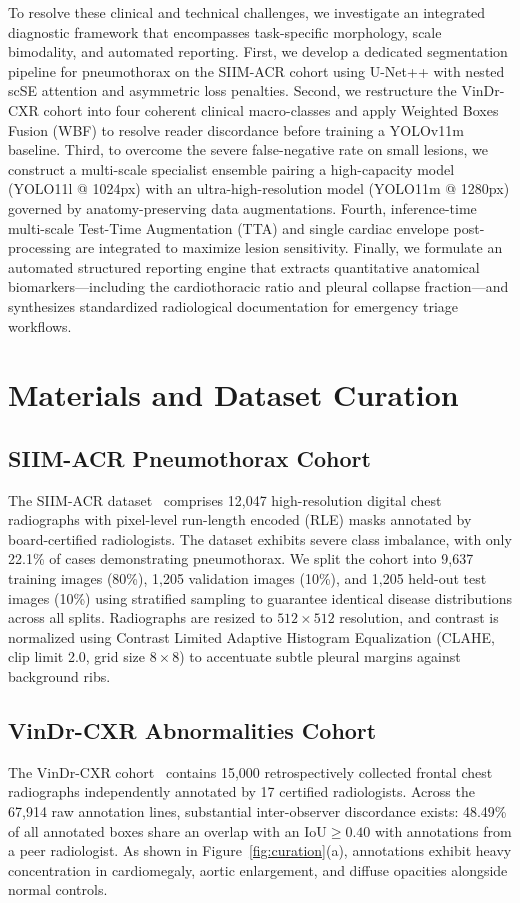 \documentclass[10pt,twocolumn,letterpaper]{article}
\begin{document}
To resolve these clinical and technical challenges, we investigate an integrated diagnostic framework that encompasses task-specific morphology, scale bimodality, and automated reporting. First, we develop a dedicated segmentation pipeline for pneumothorax on the SIIM-ACR cohort using U-Net++ with nested scSE attention and asymmetric loss penalties. Second, we restructure the VinDr-CXR cohort into four coherent clinical macro-classes and apply Weighted Boxes Fusion (WBF) to resolve reader discordance before training a YOLOv11m baseline. Third, to overcome the severe false-negative rate on small lesions, we construct a multi-scale specialist ensemble pairing a high-capacity model (YOLO11l @ 1024px) with an ultra-high-resolution model (YOLO11m @ 1280px) governed by anatomy-preserving data augmentations. Fourth, inference-time multi-scale Test-Time Augmentation (TTA) and single cardiac envelope post-processing are integrated to maximize lesion sensitivity. Finally, we formulate an automated structured reporting engine that extracts quantitative anatomical biomarkers---including the cardiothoracic ratio and pleural collapse fraction---and synthesizes standardized radiological documentation for emergency triage workflows.

\section{Materials and Dataset Curation}
\subsection{SIIM-ACR Pneumothorax Cohort}
The SIIM-ACR dataset~\cite{siim2019pneumothorax} comprises 12,047 high-resolution digital chest radiographs with pixel-level run-length encoded (RLE) masks annotated by board-certified radiologists. The dataset exhibits severe class imbalance, with only 22.1\% of cases demonstrating pneumothorax. We split the cohort into 9,637 training images (80\%), 1,205 validation images (10\%), and 1,205 held-out test images (10\%) using stratified sampling to guarantee identical disease distributions across all splits. Radiographs are resized to $512 \times 512$ resolution, and contrast is normalized using Contrast Limited Adaptive Histogram Equalization (CLAHE, clip limit 2.0, grid size $8\times 8$) to accentuate subtle pleural margins against background ribs.

\subsection{VinDr-CXR Abnormalities Cohort}
The VinDr-CXR cohort~\cite{nguyen2022vindrcxr} contains 15,000 retrospectively collected frontal chest radiographs independently annotated by 17 certified radiologists. Across the 67,914 raw annotation lines, substantial inter-observer discordance exists: 48.49\% of all annotated boxes share an overlap with an $\text{IoU} \ge 0.40$ with annotations from a peer radiologist. As shown in Figure~\ref{fig:curation}(a), annotations exhibit heavy concentration in cardiomegaly, aortic enlargement, and diffuse opacities alongside normal controls.
\end{document}
